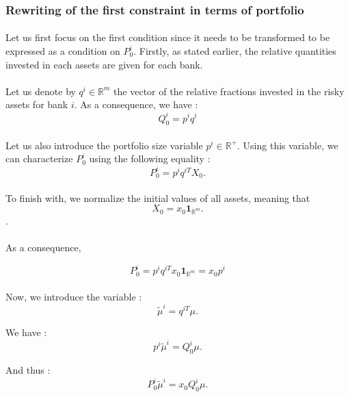 \documentclass{article}
\begin{document}
\begin{appendices}
\subsubsection{Rewriting of the first constraint in terms of portfolio}

\paragraph{}
Let us first focus on the first condition since it needs to be transformed to be expressed as a condition on $P_0^i$. Firstly, as stated earlier, the relative quantities invested in each assets are given for each bank. 

\paragraph{}
Let us denote by $q^i \in \mathbb{R}^m$ the vector of the relative fractions invested in the risky assets for bank $i$. As a consequence, we have : 
$$Q_0^i = p^i q^i $$

\paragraph{}
Let us also introduce the portfolio size variable $p^i \in \mathbb{R}^+$. Using this variable, we can characterize $P_0^i$ using the following equality :  
$$P_0^i = p^i q^{iT} X_0.$$

\paragraph{}
To finish with, we normalize the initial values of all assets, meaning that 
$$X_0 = x_0 \mathbf{1}_{\mathbb{R}^m}.$$. 

\paragraph{}
As a consequence,

$$P_0^i = p^i q^{iT} x_0 \mathbf{1}_{\mathbb{R}^m} = x_0 p^i$$

\paragraph{}
Now, we introduce the variable : 
$$ \tilde{\mu}^i = q^{iT} \mu.$$

We have : 
$$ p^i \tilde{\mu}^i = Q_0^{i} \mu.$$

And thus : 
$$ P_0^i \tilde{\mu}^i = x_0 Q_0^{i} \mu.$$


\end{appendices}
\end{document}
